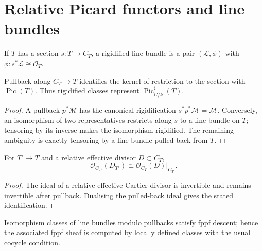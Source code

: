 \chapter{Relative Picard functors and line bundles}
\label{mk-ch-picard}

\begin{definition}
  \label{mk-def-rigidified-line-bundle}
  \cite{kleiman-picard}
  If \(T\) has a section \(s:T\to C_T\), a rigidified line bundle is a pair
  \((\mathcal L,\phi)\) with \(\phi:s^*\mathcal L\cong\mathcal O_T\).
\end{definition}

\begin{lemma}
  \label{mk-lem-rigidification-quotient}
  \cite{kleiman-picard}
  Pullback along \(C_T\to T\) identifies the kernel of restriction to the
  section with \(\operatorname{Pic}(T)\).  Thus rigidified classes represent
  \(\operatorname{Pic}^{\sharp}_{C/k}(T)\).
\end{lemma}

\begin{proof}
  A pullback \(p^*\mathcal M\) has the canonical rigidification
  \(s^*p^*\mathcal M=\mathcal M\).  Conversely, an isomorphism of two
  representatives restricts along \(s\) to a line bundle on \(T\); tensoring
  by its inverse makes the isomorphism rigidified.  The remaining ambiguity is
  exactly tensoring by a line bundle pulled back from \(T\).
\end{proof}

\begin{lemma}
  \label{mk-lem-divisor-bundle-base-change}
  \cite{kleiman-picard}
  For \(T'\to T\) and a relative effective divisor \(D\subset C_T\),
  \[
    \mathcal O_{C_{T'}}(D_{T'})\cong
    \mathcal O_{C_T}(D)\big|_{C_{T'}}.
  \]
\end{lemma}

\begin{proof}
  The ideal of a relative effective Cartier divisor is invertible and remains
  invertible after pullback.  Dualising the pulled-back ideal gives the stated
  identification.
\end{proof}

\begin{proposition}
  \label{mk-prop-picard-sheaf}
  \cite{kleiman-picard}
  Isomorphism classes of line bundles modulo pullbacks satisfy fppf descent;
  hence the associated fppf sheaf is computed by locally defined classes with
  the usual cocycle condition.
\end{proposition}

